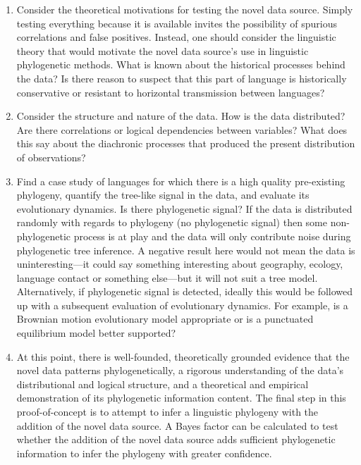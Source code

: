 \begin{enumerate}
\def\labelenumi{\arabic{enumi}.}
\item
  Consider the theoretical motivations for testing the novel data source. Simply testing everything because it is available invites the possibility of spurious correlations and false positives. Instead, one should consider the linguistic theory that would motivate the novel data source's use in linguistic phylogenetic methods. What is known about the historical processes behind the data? Is there reason to suspect that this part of language is historically conservative or resistant to horizontal transmission between languages?
\item
  Consider the structure and nature of the data. How is the data distributed? Are there correlations or logical dependencies between variables? What does this say about the diachronic processes that produced the present distribution of observations?
\item
  Find a case study of languages for which there is a high quality pre-existing phylogeny, quantify the tree-like signal in the data, and evaluate its evolutionary dynamics. Is there phylogenetic signal? If the data is distributed randomly with regards to phylogeny (no phylogenetic signal) then some non-phylogenetic process is at play and the data will only contribute noise during phylogenetic tree inference. A negative result here would not mean the data is uninteresting---it could say something interesting about geography, ecology, language contact or something else---but it will not suit a tree model. Alternatively, if phylogenetic signal is detected, ideally this would be followed up with a subsequent evaluation of evolutionary dynamics. For example, is a Brownian motion evolutionary model appropriate or is a punctuated equilibrium model better supported?
\item
  At this point, there is well-founded, theoretically grounded evidence that the novel data patterns phylogenetically, a rigorous understanding of the data's distributional and logical structure, and a theoretical and empirical demonstration of its phylogenetic information content. The final step in this proof-of-concept is to attempt to infer a linguistic phylogeny with the addition of the novel data source. A Bayes factor can be calculated to test whether the addition of the novel data source adds sufficient phylogenetic information to infer the phylogeny with greater confidence.
\end{enumerate}


